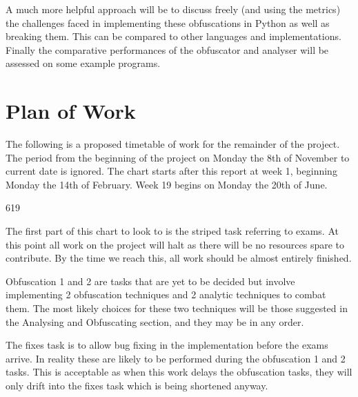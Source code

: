 \documentclass{report}
\begin{document}
A much more helpful approach will be to discuss freely (and using the metrics) the challenges faced in implementing these obfuscations
in Python as well as breaking them. This can be compared to other languages and implementations. Finally the comparative performances
of the obfuscator and analyser will be assessed on some example programs.

\section{Plan of Work}

The following is a proposed timetable of work for the remainder of the project. The period from the beginning of the project on Monday
the 8th of November to current date is ignored. The chart starts after this report at week 1, beginning Monday the 14th
of February. Week 19 begins on Monday the 20th of June.

\begin{PstGanttChart}[
    ChartShowIntervals,
    ChartUnitIntervalName={},
    ]{6}{19}
\end{PstGanttChart}

The first part of this chart to look to is the striped task referring to exams. At this point all work on the project will halt as there will be no
resources spare to contribute. By the time we reach this, all work should be almost entirely finished.

Obfuscation 1 and 2 are tasks that are yet to be decided but involve implementing 2 obfuscation techniques and 2 analytic techniques
to combat them. The most likely choices for these two techniques will be those suggested in the Analysing and Obfuscating section, and
they may be in any order.

The fixes task is to allow bug fixing in the implementation before the exams arrive. In reality these are likely to be performed during
the obfuscation 1 and 2 tasks. This is acceptable as when this work delays the obfuscation tasks, they will only drift into the fixes task
which is being shortened anyway.
\end{document}
